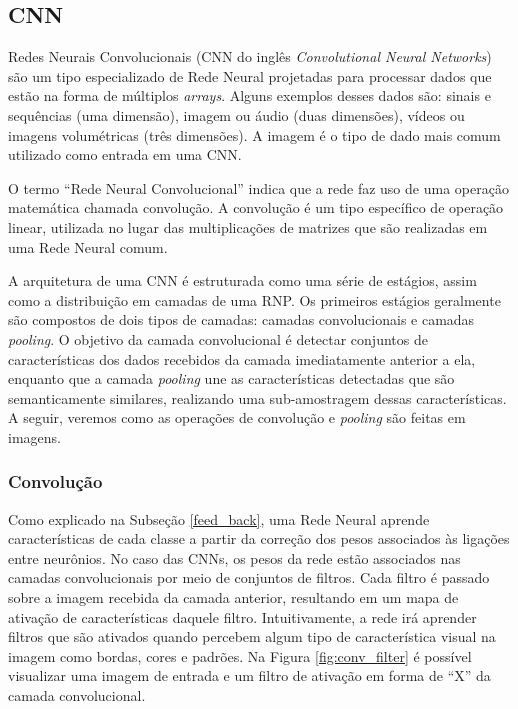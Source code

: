 \documentclass[
12pt,				%
openright,			%
oneside,			%
a4paper,			%
english,			%
french,				%
spanish,			%
brazil				%
]{abntex2}
\begin{document}
\subsection{CNN} \label{cnn}

Redes Neurais Convolucionais (CNN do inglês \textit{Convolutional Neural Networks}) \cite{lecun1989cnn} são um tipo especializado de Rede Neural projetadas para processar dados que estão na forma de múltiplos \textit{arrays}. Alguns exemplos desses dados são: sinais e sequências (uma dimensão), imagem ou áudio (duas dimensões), vídeos ou imagens volumétricas (três dimensões). A imagem é o tipo de dado mais comum utilizado como entrada em uma CNN. 

O termo ``Rede Neural Convolucional'' indica que a rede faz uso de uma operação matemática chamada convolução. A convolução é um tipo específico de operação linear, utilizada no lugar das multiplicações de matrizes que são realizadas em uma Rede Neural comum.

A arquitetura de uma CNN é estruturada como uma série de estágios, assim como a distribuição em camadas de uma RNP. Os primeiros estágios geralmente são compostos de dois tipos de camadas: camadas convolucionais e camadas \textit{pooling}. O objetivo da camada convolucional é detectar conjuntos de características dos dados recebidos da camada imediatamente anterior a ela, enquanto que a camada \textit{pooling} une as características detectadas que são semanticamente similares, realizando uma sub-amostragem dessas características. A seguir, veremos como as operações de convolução e \textit{pooling} são feitas em imagens.

\subsubsection{Convolução} \label{convolucao}

Como explicado na Subseção \ref{feed_back}, uma Rede Neural aprende características de cada classe a partir da correção dos pesos associados às ligações entre neurônios. No caso das CNNs, os pesos da rede estão associados nas camadas convolucionais por meio de conjuntos de filtros. Cada filtro é passado sobre a imagem recebida da camada anterior, resultando em um mapa de ativação de características daquele filtro. Intuitivamente, a rede irá aprender filtros que são ativados quando percebem algum tipo de característica visual na imagem como bordas, cores e padrões. Na Figura \ref{fig:conv_filter} é possível visualizar uma imagem de entrada e um filtro de ativação em forma de ``X'' da camada convolucional.
\end{document}

